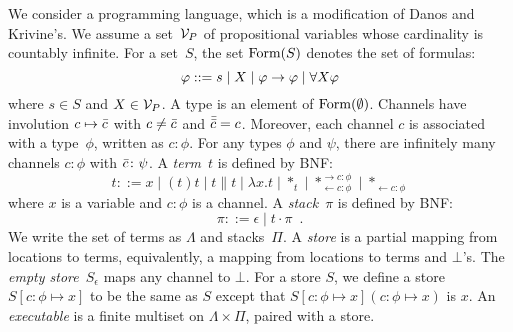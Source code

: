 
\newcommand{\conc}{\parallel}
\newcommand{\comod}[4]{\ast^{\rightarrow {#3 \colon
{#4}}}_{\leftarrow{#1\colon {#2}}}}
\newcommand{\reader}[2]{\ast_{\leftarrow{#1\colon {#2}}}}

We consider a programming language, which is a modification of
Danos and Krivine's.
We assume a set~$\mathcal V_P$ of propositional variables whose cardinality is
countably infinite.
For a set~$S$,
the set $\mathop{\text{Form}}(S)$ denotes the set of formulas:
\[
\varphi::= s \mid X \mid \varphi\rightarrow\varphi\mid \forall X \varphi
\]
where $s\in S$ and $X\in \mathcal V_P$.
A type is an element of $\mathop{\text{Form}}(\emptyset)$.
Channels have involution $c\mapsto\bar{c}$ with
$c\neq \bar{c}$ and
$\bar{\bar{c}} = c$.
Moreover, each channel $c$ is associated with a type~$\phi$,
written as $c\colon\phi$.
For any types $\phi$ and $\psi$, there are infinitely many
channels $c\colon\phi$ with $\bar{c}\colon\psi$.
A \textit{term}~$t$ is defined by BNF:
\[
 t::= x
 \mid (t)t
 \mid t\conc t
 \mid \lambda x.t
 \mid \ast_t
 \mid \comod c\phi c\phi
 \mid \reader  c\phi
\]
where $x$ is a variable and $c\colon\phi$ is a channel.
A \textit{stack}~$\pi$ is defined by BNF:
\[
 \pi ::= \epsilon
 \mid t\cdot \pi
 \enspace.
\]
We write the set of terms as $\Lambda$ and stacks~$\Pi$.
A \textit{store} is a partial mapping from locations to
terms, equivalently, a mapping from locations to terms and $\bot$'s.
The \textit{empty store}~$S_\epsilon$ maps any channel to $\bot$.
For a store $S$, we define a store $S[c\colon\phi\mapsto x]$ to be
the same as $S$ except that $S[c\colon\phi\mapsto x](c\colon\phi\mapsto
x)$ is $x$.
An \textit{executable} is a finite multiset on $\Lambda \times \Pi$,
paired with a store.

